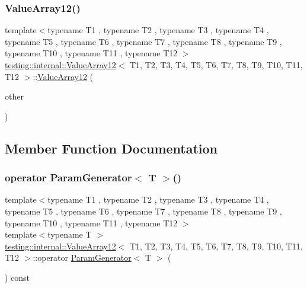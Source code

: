 \subsubsection{\texorpdfstring{ValueArray12()}{ValueArray12()}\hspace{0.1cm}{\footnotesize\ttfamily [2/2]}}
{\footnotesize\ttfamily template$<$typename T1 , typename T2 , typename T3 , typename T4 , typename T5 , typename T6 , typename T7 , typename T8 , typename T9 , typename T10 , typename T11 , typename T12 $>$ \\
\mbox{\hyperlink{classtesting_1_1internal_1_1ValueArray12}{testing\+::internal\+::\+Value\+Array12}}$<$ T1, T2, T3, T4, T5, T6, T7, T8, T9, T10, T11, T12 $>$\+::\mbox{\hyperlink{classtesting_1_1internal_1_1ValueArray12}{Value\+Array12}} (\begin{DoxyParamCaption}\item[{const \mbox{\hyperlink{classtesting_1_1internal_1_1ValueArray12}{Value\+Array12}}$<$ T1, T2, T3, T4, T5, T6, T7, T8, T9, T10, T11, T12 $>$ \&}]{other }\end{DoxyParamCaption})\hspace{0.3cm}{\ttfamily [inline]}}



\subsection{Member Function Documentation}
\mbox{\label{classtesting_1_1internal_1_1ValueArray12_acc840a1c32a10ce160731d66c8105e0b}} 
\subsubsection{\texorpdfstring{operator ParamGenerator$<$ T $>$()}{operator ParamGenerator< T >()}}
{\footnotesize\ttfamily template$<$typename T1 , typename T2 , typename T3 , typename T4 , typename T5 , typename T6 , typename T7 , typename T8 , typename T9 , typename T10 , typename T11 , typename T12 $>$ \\
template$<$typename T $>$ \\
\mbox{\hyperlink{classtesting_1_1internal_1_1ValueArray12}{testing\+::internal\+::\+Value\+Array12}}$<$ T1, T2, T3, T4, T5, T6, T7, T8, T9, T10, T11, T12 $>$\+::operator \mbox{\hyperlink{classtesting_1_1internal_1_1ParamGenerator}{Param\+Generator}}$<$ T $>$ (\begin{DoxyParamCaption}{ }\end{DoxyParamCaption}) const\hspace{0.3cm}{\ttfamily [inline]}}



